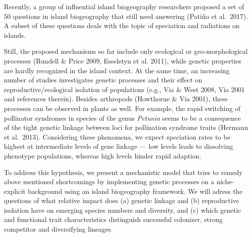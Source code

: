 \documentclass[a4paper]{scrartcl}
\begin{document}
Recently, a group of influential island biogeography researchers proposed a set of 50 questions in island biogeography that still need answering (Patiño et al.\ 2017).
A subset of these questions deals with the topic of speciation and radiations on islands.

Still, the proposed mechanisms so far include only ecological or geo-morphological processes (Rundell \& Price 2009, Esselstyn et al. 2011),
while genetic properties are hardly recognized in the island context.
At the same time, an increasing number of studies investigates genetic processes and
their effect on reproductive/ecological isolation of populations (e.g., Via \& West 2008, Via 2001 and references therein).
Besides arthropods (Howthorne \& Via 2001), these processes can be observed in plants as well.
For example, the rapid switching of pollinator syndromes in species of the genus \textit{Petunia} %
seems to be a consequence of the tight genetic linkage between loci for pollination syndrome traits (Hermann et al.\ 2013). %
Considering these phenomena, we expect speciation rates to be highest at intermediate levels of gene linkage --- low
levels leads to dissolving phenotype populations, whereas high levels hinder rapid adaption.



To address this hypothesis, we present a mechanistic model that tries to remedy above mentioned shortcomings
by implementing genetic processes on a niche-explicit background
using an island biogeography framework.%
We will adress the questions of what relative impact does (a) genetic linkage and
(b) reproductive isolation have on emerging species numbers and diversity,
and (c) which genetic and functional trait characteristics distinguish successful colonizer,
strong competitor and diversifying lineages.
\end{document}
